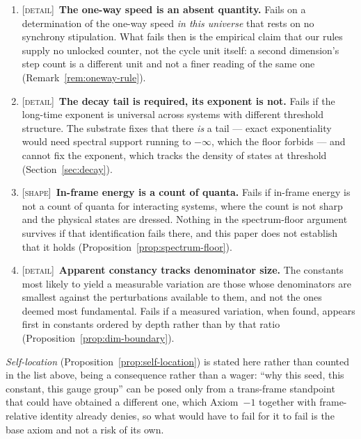 \documentclass[11pt,a4paper]{article}
\theoremstyle{remark}\newtheorem{remark}[definition]{Remark}
\begin{document}
\begin{enumerate}[leftmargin=*]
\item \textsc{[detail]}~\textbf{The one-way speed is an absent quantity.} Fails on a determination of
the one-way speed \emph{in this universe} that rests on no synchrony stipulation. What fails then is
the empirical claim that our rules supply no unlocked counter, not the cycle unit itself: a second
dimension's step count is a different unit and not a finer reading of the same one
(Remark~\ref{rem:oneway-rule}).

\item \textsc{[detail]}~\textbf{The decay tail is required, its exponent is not.} Fails if the
long-time exponent is universal across systems with different threshold structure. The substrate
fixes that there \emph{is} a tail --- exact exponentiality would need spectral support running to
$-\infty$, which the floor forbids --- and cannot fix the exponent, which tracks the density of
states at threshold (Section~\ref{sec:decay}).

\item \textsc{[shape]}~\textbf{In-frame energy is a count of quanta.} Fails if in-frame energy is not
a count of quanta for interacting systems, where the count is not sharp and the physical states are
dressed. Nothing in the spectrum-floor argument survives if that identification fails there, and this
paper does not establish that it holds (Proposition~\ref{prop:spectrum-floor}).

\item \textsc{[detail]}~\textbf{Apparent constancy tracks denominator size.} The constants most
likely to yield a measurable variation are those whose denominators are smallest against the
perturbations available to them, and not the ones deemed most fundamental. Fails if a measured
variation, when found, appears first in constants ordered by depth rather than by that ratio
(Proposition~\ref{prop:dim-boundary}).
\end{enumerate}

\noindent\emph{Self-location} (Proposition~\ref{prop:self-location}) is stated here rather than
counted in the list above, being a consequence rather than a wager: ``why this seed, this constant,
this gauge group'' can be posed only from a trans-frame standpoint that could have obtained a
different one, which Axiom~$-1$ together with frame-relative identity already denies, so what would
have to fail for it to fail is the base axiom and not a risk of its own.
\end{document}
